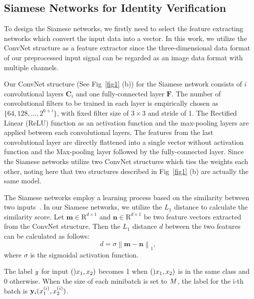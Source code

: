 \documentclass[runningheads]{llncs}
\begin{document}
\subsection{Siamese Networks for Identity Verification}

To design the Siamese networks, we firstly need to select the feature extracting networks which convert the input data into a vector. In this work, we utilize the ConvNet structure \cite{lecun1998gradient} as a feature extractor since the three-dimensional data format of our preprocessed input signal can be regarded as an image data format with multiple channels. 

Our ConvNet structure (See Fig~\ref{fig1} (b)) for the Siamese network consists of $i$ convolutional layers $\mathbf{C}_{i}$ and one fully-connected layer $\mathbf{F}$. The number of convolutional filters to be trained in each layer is empirically chosen as $\{64, 128, ...,  2^{6+i}\}$, with fixed filter size of $3\times3$ and stride of 1. The Rectiﬁed Linear (ReLU) function as an activation function and the max-pooling layers are applied between each convolutional layers. The features from the last convolutional layer are directly flattened into a single vector without activation function and the Max-pooling layer followed by the fully-connected layer.
Since the Siamese networks utilize two ConvNet structures which ties the weights each other, noting here that two structures described in Fig~\ref{fig1} (b) are actually the same model.

The Siamese networks employ a learning process based on the similarity between two inputs~\cite{koch2015siamese}. In our Siamese networks, we utilize the $L_1$ distance to calculate the similarity score. Let $\mathbf{m}\in{\mathrm{R}}^{d\times1}$ and $\mathbf{n}\in{\mathrm{R}}^{d\times1}$ be two feature vectors extracted from the ConvNet structure. Then the $L_1$ distance $d$ between the two features can be calculated as follows:
\begin{equation}
d = \sigma {\left\| {{\mathbf{m}} - {\mathbf{n}}} \right\|_1}  ,
\end{equation}
where $\sigma$ is the sigmoidal activation function. 

The label $\mathnormal{y}$ for input $()\mathnormal{x}_{1},\mathnormal{x}_{2})$ becomes 1 when $()\mathnormal{x}_{1},\mathnormal{x}_{2})$ is in the same class and 0 otherwise.
When the size of each minibatch is set to $\mathnormal{M}$, the label for the i-th batch is $\mathbf{y}_{i}(\mathnormal{x}_{1}^{(i)},\mathnormal{x}_{2}^{(i)})$.
\end{document}
